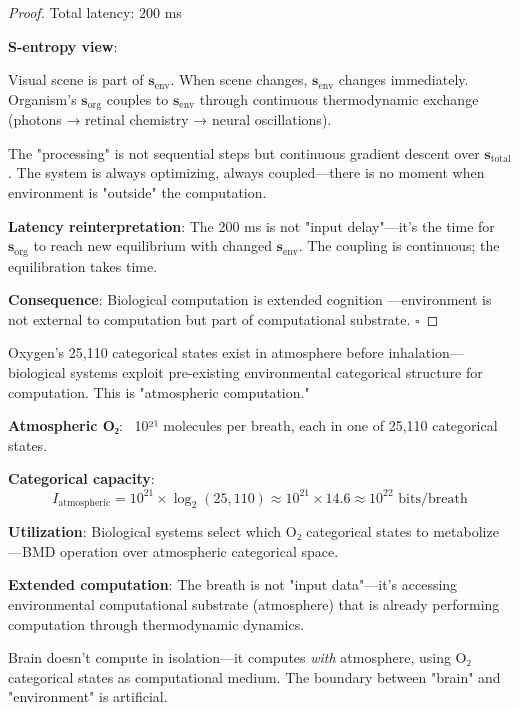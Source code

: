 \begin{proof}
Total latency: 200 ms

\textbf{S-entropy view}:

Visual scene is part of $\mathbf{s}_{\text{env}}$. When scene changes, $\mathbf{s}_{\text{env}}$ changes immediately. Organism's $\mathbf{s}_{\text{org}}$ couples to $\mathbf{s}_{\text{env}}$ through continuous thermodynamic exchange (photons → retinal chemistry → neural oscillations).

The "processing" is not sequential steps but continuous gradient descent over $\mathbf{s}_{\text{total}}$. The system is always optimizing, always coupled—there is no moment when environment is "outside" the computation.

\textbf{Latency reinterpretation}: The 200 ms is not "input delay"—it's the time for $\mathbf{s}_{\text{org}}$ to reach new equilibrium with changed $\mathbf{s}_{\text{env}}$. The coupling is continuous; the equilibration takes time.

\textbf{Consequence}: Biological computation is extended cognition \cite{clark1998extended}—environment is not external to computation but part of computational substrate. $\square$
\end{proof}

\begin{corollary}
Oxygen's 25,110 categorical states exist in atmosphere before inhalation—biological systems exploit pre-existing environmental categorical structure for computation. This is "atmospheric computation."
\end{corollary}

\begin{example}
\textbf{Atmospheric O₂}: ~10²¹ molecules per breath, each in one of 25,110 categorical states.

\textbf{Categorical capacity}:
\begin{equation}
I_{\text{atmospheric}} = 10^{21} \times \log_2(25{,}110) \approx 10^{21} \times 14.6 \approx 10^{22} \text{ bits/breath}
\end{equation}

\textbf{Utilization}: Biological systems select which O₂ categorical states to metabolize—BMD operation over atmospheric categorical space.

\textbf{Extended computation}: The breath is not "input data"—it's accessing environmental computational substrate (atmosphere) that is already performing computation through thermodynamic dynamics.

Brain doesn't compute in isolation—it computes \textit{with} atmosphere, using O₂ categorical states as computational medium. The boundary between "brain" and "environment" is artificial.
\end{example}

